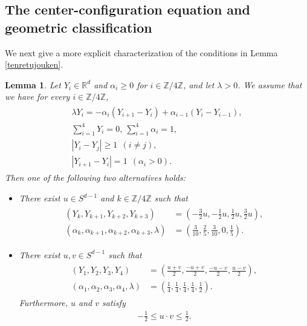 \documentclass[reqno]{amsart}
\theoremstyle{plain}
\newtheorem{lemma}[theorem]{Lemma}
\theoremstyle{definition}
\numberwithin{equation}{section}
\begin{document}
\subsection{The center-configuration equation and geometric classification}

We next give a more explicit characterization of the conditions in Lemma \ref{tenretujouken}.

\begin{lemma}\label{Yhishi}
Let $Y_i\in\mathbb{R}^d$ and $\alpha_i\geq0$ for $i\in\mathbb{Z}/4\mathbb{Z}$, and let $\lambda>0$. We assume that we have for every $i\in\mathbb{Z}/4\mathbb{Z}$,
\begin{align}\label{Yichiass}
\begin{aligned}
\lambda Y_i=-\alpha_i\left(Y_{i+1}-Y_i\right)+\alpha_{i-1}\left(Y_i-Y_{i-1}\right),
\\
\sum_{i=1}^4Y_i=0,\ \sum_{i=1}^4\alpha_i=1,
\\
\left|Y_i-Y_j\right|\geq 1\ \ (i\neq j),
\\
\left|Y_{i+1}-Y_i\right|=1\ \ (\alpha_i>0).
\end{aligned}
\end{align}
Then one of the following two alternatives holds:
\begin{itemize}
\item There exist $u\in S^{d-1}$ and $k\in\mathbb{Z}/4\mathbb{Z}$ such that 
\begin{align}\label{tyokusengata}
\begin{aligned}
\left(Y_k,Y_{k+1},Y_{k+2},Y_{k+3}\right)&=\left(-\frac{3}{2}u,-\frac{1}{2}u,\frac{1}{2}u,\frac{3}{2}u\right),
\\
\left(\alpha_k,\alpha_{k+1},\alpha_{k+2},\alpha_{k+3},\lambda\right)&=\left(\frac{3}{10},\frac{2}{5},\frac{3}{10},0,\frac{1}{5}\right).
\end{aligned}
\end{align}

\item There exist $u,v\in S^{d-1}$ such that 
\begin{align}\label{hishigatagata}
\begin{aligned}
\left(Y_1,Y_2,Y_3,Y_4\right)&=\left(\frac{u+v}{2},\frac{-u+v}{2},\frac{-u-v}{2},\frac{u-v}{2}\right),
\\
\left(\alpha_1,\alpha_2,\alpha_3,\alpha_4,\lambda\right)&=\left(\frac{1}{4},\frac{1}{4},\frac{1}{4},\frac{1}{4},\frac{1}{2}\right).
\end{aligned}
\end{align}
Furthermore, $u$ and $v$ satisfy 
\begin{align}\label{hishigatanaisekijouken}
-\frac{1}{2}\leq u\cdot v\leq \frac{1}{2}.
\end{align}
\end{itemize}
\end{lemma}
\end{document}
